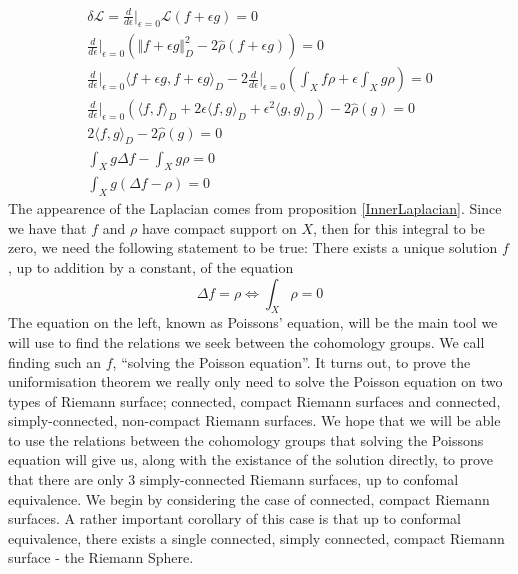 \documentclass[11pt]{report}
\theoremstyle{definition}
\begin{document}
\begin{gather*}
  \delta \mathcal{L} = \frac{d}{d\epsilon}\biggr\rvert_{\epsilon = 0}\mathcal{L}(f+\epsilon g) = 0 \\
  \frac{d}{d\epsilon}\biggr\rvert_{\epsilon = 0}(\Vert f+\epsilon g\Vert _D^2 -2\hat{\rho}(f+\epsilon g)) = 0 \\
  \frac{d}{d\epsilon}\biggr\rvert_{\epsilon = 0} \langle f + \epsilon g, f + \epsilon g \rangle_D -2\frac{d}{d\epsilon}\biggr\rvert_{\epsilon = 0}(\int_X f\rho  + \epsilon \int_X g\rho) = 0 \\
  \frac{d}{d\epsilon}\biggr\rvert_{\epsilon = 0}(\langle f, f \rangle_D + 2\epsilon \langle f, g \rangle_D +\epsilon^2 \langle g, g \rangle_D) -2 \hat{\rho}(g) = 0 \\
  2\langle f, g \rangle_D -2\hat{\rho}(g) = 0 \\
  \int_X g\Delta f - \int_X g\rho = 0 \\
  \int_X g(\Delta f - \rho) = 0 
\end{gather*}
The appearence of the Laplacian comes from proposition \ref{InnerLaplacian}.
Since we have that $f$ and $\rho$ have compact support on $X$, then for this integral to be zero, we need the following statement to be true: There exists a unique solution $f$, up to addition by a constant, of the equation 
\[ \Delta f = \rho \Longleftrightarrow \int_X \rho = 0\]
The equation on the left, known as Poissons' equation, will be the main tool we will use to find the relations we seek between the cohomology groups. We call finding such an $f$, ``solving the Poisson equation''. It turns out, to prove the uniformisation theorem we really only need to solve the Poisson equation on two types of Riemann surface; connected, compact Riemann surfaces and connected, simply-connected, non-compact Riemann surfaces. We hope that we will be able to use the relations between the cohomology groups that solving the Poissons equation will give us, along with the existance of the solution directly, to prove that there are only $3$ simply-connected Riemann surfaces, up to confomal equivalence. \newline We begin by considering the case of connected, compact Riemann surfaces. A rather important corollary of this case is that up to conformal equivalence, there exists a single connected, simply connected, compact Riemann surface - the Riemann Sphere. 
\end{document}
